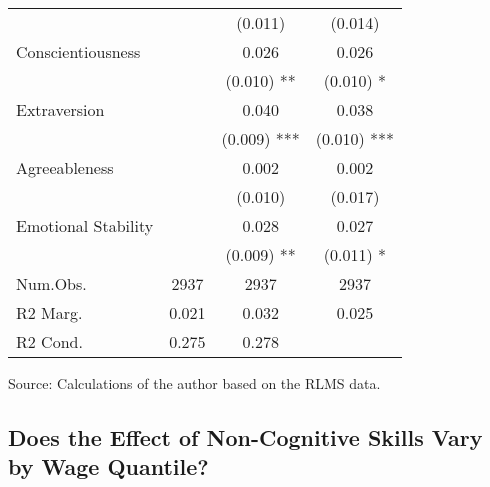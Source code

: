 \documentclass[
]{interact}
\begin{document}
\begin{table}
{\begin{tabular*}{\linewidth}{@{\extracolsep{\fill}}lccc}
 &  & (0.011) & (0.014) \\ 
Conscientiousness &  & 0.026 & 0.026 \\ 
 &  & (0.010) ** & (0.010) * \\ 
Extraversion &  & 0.040 & 0.038 \\ 
 &  & (0.009) *** & (0.010) *** \\ 
Agreeableness &  & 0.002 & 0.002 \\ 
 &  & (0.010) & (0.017) \\ 
Emotional Stability &  & 0.028 & 0.027 \\ 
{} & {} & {(0.009) **} & {(0.011) *} \\ 
Num.Obs. & 2937 & 2937 & 2937 \\ 
R2 Marg. & 0.021 & 0.032 & 0.025 \\ 
R2 Cond. & 0.275 & 0.278 &  \\ 
\bottomrule
\end{tabular*}
\begin{minipage}{\linewidth}
Source: Calculations of the author based on the RLMS data.\\
\end{minipage}

}

\end{table}%

\subsection{Does the Effect of Non-Cognitive Skills Vary by Wage
Quantile?}\label{does-the-effect-of-non-cognitive-skills-vary-by-wage-quantile}
\end{document}
